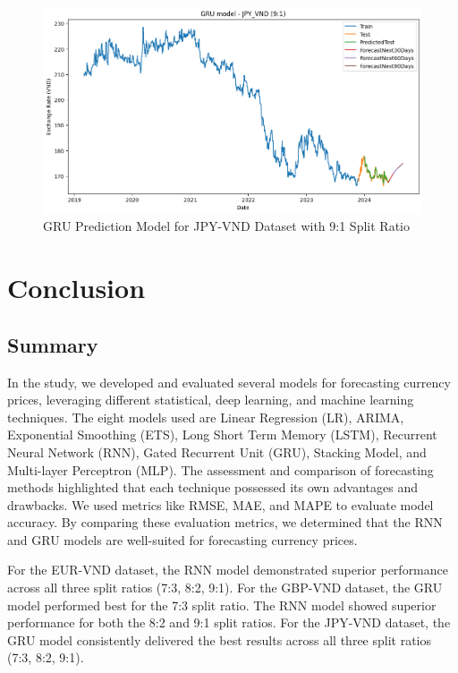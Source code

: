 \documentclass{ieeeojies}
\begin{document}
\begin{figure}[H]
  \centering
  \begin{minipage}{0.8\linewidth}
    \centering
    \includegraphics[width=\linewidth]{GRU/GRU_jpy_91.png}
    \caption{GRU Prediction Model for JPY-VND Dataset with 9:1 Split Ratio}
    \label{fig33}
  \end{minipage}
\end{figure}

\section{Conclusion}
\subsection{Summary}

In the study, we developed and evaluated several models for forecasting currency prices, leveraging different statistical, deep learning, and machine learning techniques. The eight models used are Linear Regression (LR), ARIMA, Exponential Smoothing (ETS), Long Short Term Memory (LSTM), Recurrent Neural Network (RNN), Gated Recurrent Unit (GRU), Stacking Model, and Multi-layer Perceptron (MLP). The assessment and comparison of forecasting methods highlighted that each technique possessed its own advantages and drawbacks. We used metrics like RMSE, MAE, and MAPE to evaluate model accuracy. By comparing these evaluation metrics, we determined that the RNN and GRU models are well-suited for forecasting currency prices. 

For the EUR-VND dataset, the RNN model demonstrated superior performance across all three split ratios (7:3, 8:2, 9:1). For the GBP-VND dataset, the GRU model performed best for the 7:3 split ratio. The RNN model showed superior performance for both the 8:2 and 9:1 split ratios. For the JPY-VND dataset, the GRU model consistently delivered the best results across all three split ratios (7:3, 8:2, 9:1).
\end{document}
